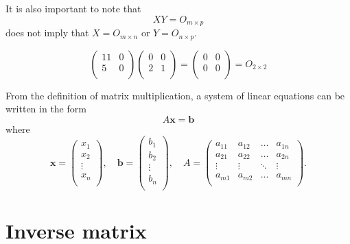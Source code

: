 \begin{remark}
    It is also important to note that \[XY=O_{m\times p}\] does not imply that $X=O_{m\times n}$ or $Y=O_{n\times p}$.
\end{remark}

\begin{example}
    \[
        \begin{pmatrix}
            11&0\\5&0\\
        \end{pmatrix}
        \begin{pmatrix}
            0&0\\2&1\\
        \end{pmatrix}
        =
        \begin{pmatrix}
            0&0\\0&0\\
        \end{pmatrix}
        =O_{2\times 2}
    \]
\end{example}

From the definition of matrix multiplication, a system of linear equations can be written in the form \[A\bm x=\bm b\] where
\[
    \bm x=
    \begin{pmatrix}
        x_1\\x_2\\\vdots\\x_n\\
    \end{pmatrix}
    ,\quad\bm b=
    \begin{pmatrix}
        b_1\\b_2\\\vdots\\b_n\\
    \end{pmatrix}
    ,\quad A=
    \begin{pmatrix}
        a_{11}&a_{12}&\ldots&a_{1n}\\
        a_{21}&a_{22}&\ldots&a_{2n}\\
        \vdots&\vdots&\ddots&\vdots\\
        a_{m1}&a_{m2}&\ldots&a_{mn}\\
    \end{pmatrix}
    .
\]

\section{Inverse matrix}

